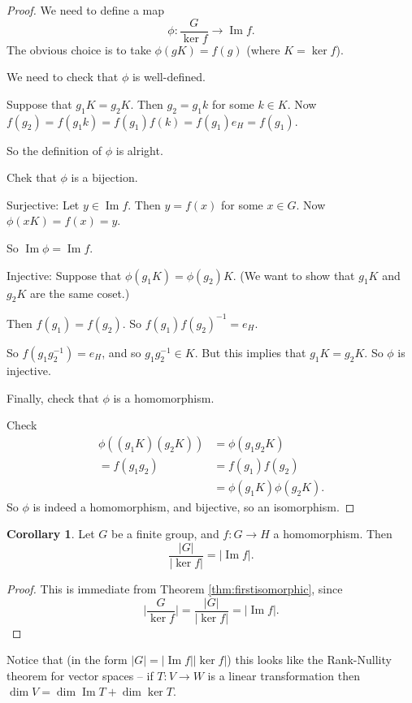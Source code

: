 \documentclass{article}
\theoremstyle{definition}
\newtheorem*{corollary}{Corollary}
\newcommand{\func}[3]{#1 : #2 \rightarrow #3}
\DeclareMathOperator{\Ima}{Im}
\begin{document}
  \begin{proof}
    We need to define a map
    \[
      \func{\phi}{\frac{G}{\ker f}}{\Ima f}.
    \]
    The obvious choice is to take $\phi (gK)=f(g)$ (where $K = \ker f$).

    We need to check that $\phi$ is well-defined.

    Suppose that $g_1K=g_2K$. Then $g_2=g_1k$ for some $k \in K$. Now $f(g_2)=f(g_1k)=f(g_1)f(k)=f(g_1)e_H=f(g_1)$.

    So the definition of $\phi$ is alright.

    Chek that $\phi$ is a bijection.

    Surjective: Let $y \in \Ima f$. Then $y=f(x)$ for some $x \in G$. Now $\phi(xK)=f(x)=y$. 

    So $\Ima \phi = \Ima f$.

    Injective: Suppose that $\phi(g_1K)=\phi(g_2)K$. (We want to show that $g_1K$ and $g_2K$ are the same coset.)

    Then $f(g_1)=f(g_2)$. So $f(g_1)f(g_2)^{-1}=e_H$.

    So $f(g_1g_2^{-1})=e_H$, and so $g_1g_2^{-1}\in K$. But this implies that $g_1K=g_2K$. So $\phi$ is injective.

    Finally, check that $\phi$ is a homomorphism.

    Check 
    \begin{align*}
    \phi((g_1K)(g_2K)) &= \phi(g_1g_2K)\\
    =f(g_1g_2)&=f(g_1)f(g_2)\\
    &=\phi(g_1K)\phi(g_2K).
    \end{align*}
    So $\phi$ is indeed a homomorphism, and bijective, so an isomorphism.
  \end{proof}

  \begin{corollary}
    Let $G$ be a finite group, and $\func{f}{G}{H}$ a homomorphism. Then
    \[
      \frac{|G|}{|\ker f|} = |\Ima f|. 
    \]
  \end{corollary}
\begin{proof}
  This is immediate from Theorem \ref{thm:firstisomorphic}, since 
  \[
    \bigl|\frac{G}{\ker f}\bigr| = \frac{|G|}{|\ker f|} = |\Ima f|. 
  \]
\end{proof}
Notice that (in the form $|G|=|\Ima f||\ker f|$) this looks like the Rank-Nullity theorem for vector spaces -- if $\func{T}{V}{W}$ is a linear transformation then $\dim V = \dim \Ima T + \dim \ker T$.
\end{document}
